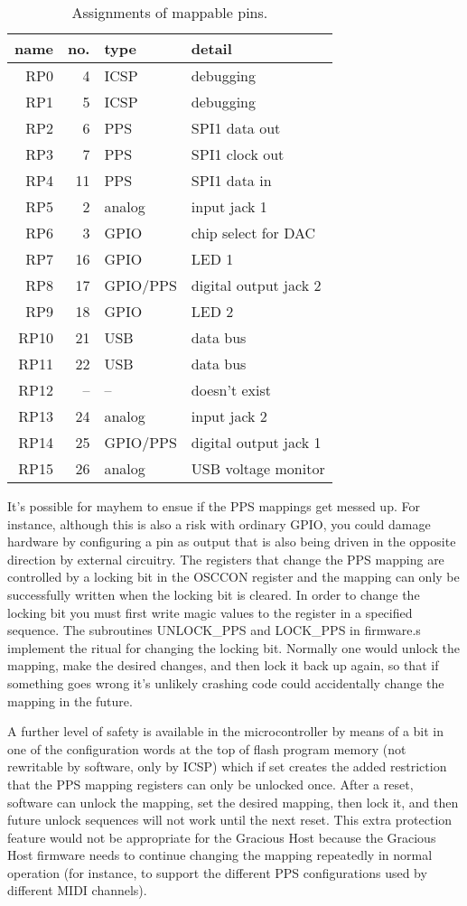 \begin{table}
{\centering
\begin{tabular}{rrll}
name & no. & type & detail \\ \hline
RP0 & 4 & ICSP & debugging \\
RP1 & 5 & ICSP & debugging \\
RP2 & 6 & PPS & SPI1 data out \\
RP3 & 7 & PPS & SPI1 clock out \\
RP4 & 11 & PPS & SPI1 data in \\
RP5 & 2 & analog & input jack 1 \\
RP6 & 3 & GPIO & chip select for DAC \\
RP7 & 16 & GPIO & LED 1 \\
RP8 & 17 & GPIO/PPS & digital output jack 2 \\
RP9 & 18 & GPIO & LED 2 \\
RP10 & 21 & USB & data bus \\
RP11 & 22 & USB & data bus \\
RP12 & -- & -- & doesn't exist \\
RP13 & 24 & analog & input jack 2 \\
RP14 & 25 & GPIO/PPS & digital output jack 1 \\
RP15 & 26 & analog & USB voltage monitor
\end{tabular}\par}
\caption{Assignments of mappable pins.}\label{tab:pps-mapping}
\end{table}

It's possible for mayhem to ensue if the PPS mappings get messed up.  For
instance, although this is also a risk with ordinary GPIO, you could damage
hardware by configuring a pin as output that is also being driven in the
opposite direction by external circuitry.  The registers that change the PPS
mapping are controlled by a locking bit in the OSCCON register and the
mapping can only be successfully written when the locking bit is cleared. 
In order to change the locking bit you must first write magic values to the
register in a specified sequence.  The subroutines UNLOCK\_PPS and LOCK\_PPS
in firmware.s implement the ritual for changing the locking bit.  Normally
one would unlock the mapping, make the desired changes, and then lock it
back up again, so that if something goes wrong it's unlikely crashing code
could accidentally change the mapping in the future.

A further level of safety is available in the microcontroller by means of a
bit in one of the configuration words at the top of flash program memory
(not rewritable by software, only by ICSP) which if set creates the added
restriction that the PPS mapping registers can only be unlocked once.  After
a reset, software can unlock the mapping, set the desired mapping, then lock
it, and then future unlock sequences will not work until the next reset. 
This extra protection feature would not be appropriate for the Gracious Host
because the Gracious Host firmware needs to continue changing the mapping
repeatedly in normal operation (for instance, to support the different
PPS configurations used by different MIDI channels).

